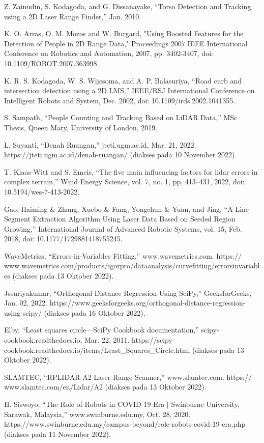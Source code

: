 Z. Zainudin, S. Kodagoda, and G. Dissanayake, “Torso Detection and Tracking using a 2D Laser Range Finder,” Jan. 2010.

K. O. Arras, O. M. Mozos and W. Burgard, "Using Boosted Features for the Detection of People in 2D Range Data," Proceedings 2007 IEEE International Conference on Robotics and Automation, 2007, pp. 3402-3407, doi: 10.1109/ROBOT.2007.363998.

K. R. S. Kodagoda, W. S. Wijesoma, and A. P. Balasuriya, “Road curb and intersection detection using a 2D LMS,” IEEE/RSJ International Conference on Intelligent Robots and System, Dec. 2002, doi: 10.1109/irds.2002.1041355.

S. Sampath, “People Counting and Tracking Based on LiDAR Data,” MSc Thesis, Queen Mary, University of London, 2019.

L. Suyanti, “Denah Ruangan,” jteti.ugm.ac.id, Mar. 21, 2022. https://jteti.ugm.ac.id/denah-ruangan/ (diakses pada 10 November 2022).

T. Klaas-Witt and S. Emeis, “The five main influencing factors for lidar errors in complex terrain,” Wind Energy Science, vol. 7, no. 1, pp. 413–431, 2022, doi: 10.5194/wes-7-413-2022.

Gao, Haiming \& Zhang, Xuebo \& Fang, Yongchun \& Yuan, and Jing, “A Line Segment Extraction Algorithm Using Laser Data Based on Seeded Region Growing,” International Journal of Advanced Robotic Systems, vol. 15, Feb. 2018, doi: 10.1177/1729881418755245.

WaveMetrics, “Errors-in-Variables Fitting,” www.wavemetrics.com. https:// www.wavemetrics.com/products/igorpro/dataanalysis/curvefitting/errorsinvariables (diakses pada 13 Oktober 2022).

Jssuriyakumar, “Orthogonal Distance Regression Using SciPy,” GeeksforGeeks, Jan. 02, 2022. https://www.geeksforgeeks.org/orthogonal-distance-regression-using-scipy/ (diakses pada 16 Oktober 2022).

Elby, “Least squares circle—SciPy Cookbook documentation,” scipy-cookbook.readthedocs.io, Mar. 22, 2011.
https://scipy-cookbook.readthedocs.io/items/Least\_Squares\_Circle.html (diakses pada 13 Oktober 2022).

SLAMTEC, “RPLIDAR-A2 Laser Range Scanner,” www.slamtec.com. https:// www.slamtec.com/en/Lidar/A2 (diakses pada 13 Oktober 2022).

H. Siswoyo, “The Role of Robots in COVID-19 Era $|$ Swinburne University, Sarawak, Malaysia,” www.swinburne.edu.my, Oct. 28, 2020. https://www.swinburne.edu.my/campus-beyond/role-robots-covid-19-era.php (diakses pada 11 November 2022).

